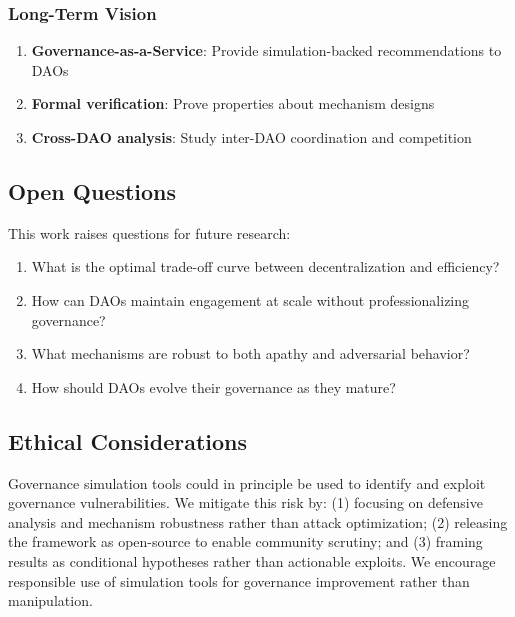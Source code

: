 \subsubsection{Long-Term Vision}

\begin{enumerate}
    \item \textbf{Governance-as-a-Service}: Provide simulation-backed recommendations to DAOs
    \item \textbf{Formal verification}: Prove properties about mechanism designs
    \item \textbf{Cross-DAO analysis}: Study inter-DAO coordination and competition
\end{enumerate}

\subsection{Open Questions}

This work raises questions for future research:

\begin{enumerate}
    \item What is the optimal trade-off curve between decentralization and efficiency?
    \item How can DAOs maintain engagement at scale without professionalizing governance?
    \item What mechanisms are robust to both apathy and adversarial behavior?
    \item How should DAOs evolve their governance as they mature?
\end{enumerate}

\subsection{Ethical Considerations}

Governance simulation tools could in principle be used to identify and exploit governance vulnerabilities. We mitigate this risk by: (1) focusing on defensive analysis and mechanism robustness rather than attack optimization; (2) releasing the framework as open-source to enable community scrutiny; and (3) framing results as conditional hypotheses rather than actionable exploits. We encourage responsible use of simulation tools for governance improvement rather than manipulation.
